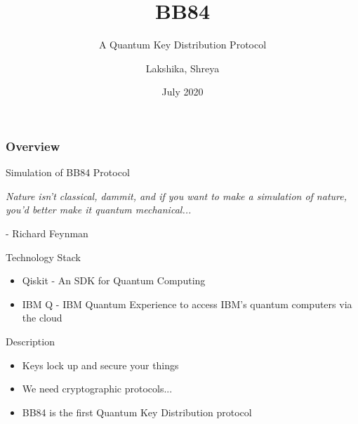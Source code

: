 \documentclass{beamer}
\title[BB84]{BB84}
\subtitle{A Quantum Key Distribution Protocol}
\author[Team 37]{Lakshika, Shreya}
\date{July 2020}
\begin{document}
\begin{frame}
	\titlepage
\end{frame}

\begin{frame}
	\frametitle{Overview}
	 Simulation of BB84 Protocol
\end{frame}


\begin{frame}[standout]
    \begin{center}
        \emph{Nature isn’t classical, dammit, and if you want to make a simulation of nature, you’d better make it quantum mechanical...}
    \end{center}
    \begin{flushright}
        - Richard Feynman
    \end{flushright}
\end{frame}


\begin{frame}{Technology Stack}
	\begin{itemize}
		\item Qiskit - An SDK for Quantum Computing
		\item IBM Q - IBM Quantum Experience to access IBM's quantum computers via the cloud
	\end{itemize}
\end{frame}

\begin{frame}{Description}
    \begin{itemize}[<+->] 
        \item Keys lock up and secure your things
        \item We need cryptographic protocols...
        \item BB84 is the first Quantum Key Distribution protocol
    \end{itemize}
\end{frame}
\end{document}
